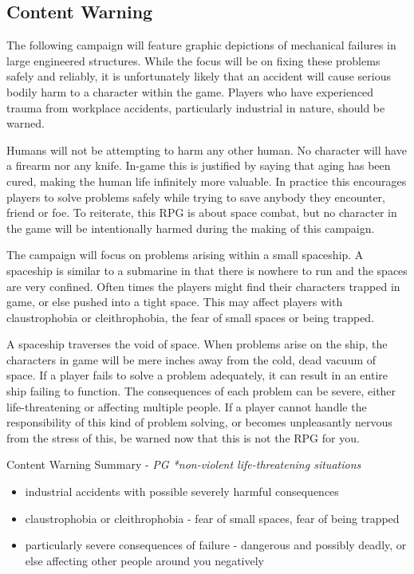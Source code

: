 \documentclass[a4paper]{article}
\begin{document}
\subsection{Content Warning}

The following campaign will feature graphic depictions of mechanical failures in large engineered structures. While the focus will be on fixing these problems safely and reliably, it is unfortunately likely that an accident will cause serious bodily harm to a character within the game. Players who have experienced trauma from workplace accidents, particularly industrial in nature, should be warned. 

Humans will not be attempting to harm any other human. No character will have a firearm nor any knife. In-game this is justified by saying that aging has been cured, making the human life infinitely more valuable. In practice this encourages players to solve problems safely while trying to save anybody they encounter, friend or foe. To reiterate, this RPG is about space combat, but no character in the game will be intentionally harmed during the making of this campaign.

The campaign will focus on problems arising within a small spaceship. A spaceship is similar to a submarine in that there is nowhere to run and the spaces are very confined. Often times the players might find their characters trapped in game, or else pushed into a tight space. This may affect players with claustrophobia or cleithrophobia, the fear of small spaces or being trapped.

A spaceship traverses the void of space. When problems arise on the ship, the characters in game will be mere inches away from the cold, dead vacuum of space. If a player fails to solve a problem adequately, it can result in an entire ship failing to function. The consequences of each problem can be severe, either life-threatening or affecting multiple people. If a player cannot handle the responsibility of this kind of problem solving, or becomes unpleasantly nervous from the stress of this, be warned now that this is not the RPG for you.

\vspace{0.5cm} \hspace{-18pt} Content Warning Summary - \textit{PG *non-violent life-threatening situations}
\begin{itemize}
\item industrial accidents with possible severely harmful consequences
\item claustrophobia or cleithrophobia - fear of small spaces, fear of being trapped
\item particularly severe consequences of failure - dangerous and possibly deadly, or else affecting other people around you negatively
\end{itemize}
\end{document}
